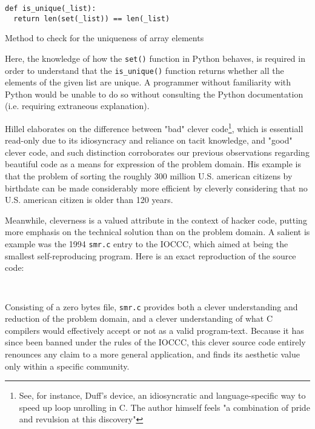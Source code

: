 \begin{listing}
  \begin{verbatim}
def is_unique(_list):
  return len(set(_list)) == len(_list)
\end{verbatim}
  \caption{Method to check for the uniqueness of array elements}
  \label{code:is_unique_python}
\end{listing}

Here, the knowledge of how the \lstinline{set()} function in Python behaves, is required in order to understand that the \lstinline{is_unique()} function returns whether all the elements of the given list are unique. A programmer without familiarity with Python would be unable to do so without consulting the Python documentation (i.e. requiring extraneous explanation).

Hillel elaborates on the difference between "bad" clever code\footnote{See, for instance, Duff's device, an idiosyncratic and language-specific way to speed up loop unrolling in C. The author himself feels "a combination of pride and revulsion at this discovery"\cite{duff_tom_1983}}, which is essentiall read-only due to its idiosyncracy and reliance on tacit knowledge, and "good" clever code, and such distinction corroborates our previous observations regarding beautiful code as a means for expression of the problem domain. His example is that the problem of sorting the roughly 300 million U.S. american citizens by birthdate can be made considerably more efficient by cleverly considering that no U.S. american citizen is older than 120 years.

Meanwhile, cleverness is a valued attribute in the context of hacker code, putting more emphasis on the technical solution than on the problem domain. A salient is example was the 1994 \lstinline{smr.c} entry to the IOCCC, which aimed at being the smallest self-reproducing program\cite{kanakarakis_international_2022}. Here is an exact reproduction of the source code:

\begin{lstlisting}
  
\end{lstlisting}

Consisting of a zero bytes file, \lstinline{smr.c} provides both a clever understanding and reduction of the problem domain, and a clever understanding of what C compilers would effectively accept or not as a valid program-text\cite{kanakarakis_international_2022a}. Because it has since been banned under the rules of the IOCCC, this clever source code entirely renounces any claim to a more general application, and finds its aesthetic value only within a specific community.

